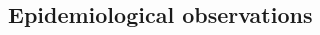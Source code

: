 \documentclass[a0,landscape]{a0poster}
\begin{document}
\begin{multicols}{3}
	
	
	
	
	\color{black}
	\large
	
		\section{Epidemiological observations}


\end{multicols}
\end{document}
